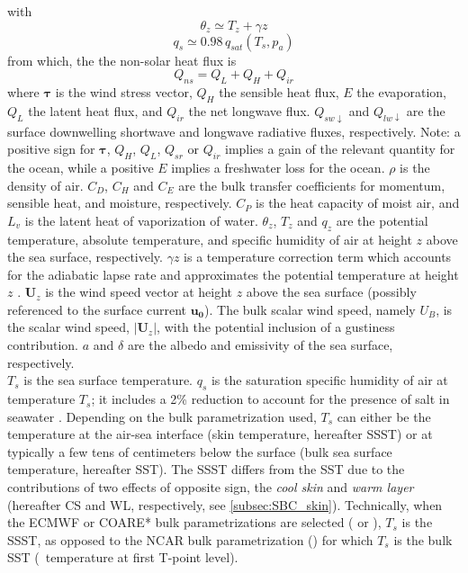 \documentclass[../main/NEMO_manual]{subfiles}
\begin{document}
with
   \[ \theta_z \simeq T_z+\gamma z \]
   \[  q_s \simeq 0.98\,q_{sat}(T_s,p_a ) \]
from which, the the non-solar heat flux is \[ Q_{ns} = Q_L + Q_H + Q_{ir} \]
where $\mathbf{\tau}$ is the wind stress vector, $Q_H$ the sensible heat flux,
$E$ the evaporation, $Q_L$ the latent heat flux, and $Q_{ir}$ the net longwave
flux.
$Q_{sw\downarrow}$ and $Q_{lw\downarrow}$ are the surface downwelling shortwave
and longwave radiative fluxes, respectively.
Note: a positive sign for $\mathbf{\tau}$, $Q_H$, $Q_L$, $Q_{sr}$ or $Q_{ir}$
implies a gain of the relevant quantity for the ocean, while a positive $E$
implies a freshwater loss for the ocean.
$\rho$ is the density of air. $C_D$, $C_H$ and $C_E$ are the bulk transfer
coefficients for momentum, sensible heat, and moisture, respectively.
$C_P$ is the heat capacity of moist air, and $L_v$ is the latent heat of
vaporization of water.
$\theta_z$, $T_z$ and $q_z$ are the potential temperature, absolute temperature,
and specific humidity of air at height $z$ above the sea surface,
respectively. $\gamma z$ is a temperature correction term which accounts for the
adiabatic lapse rate and approximates the potential temperature at height
$z$ \citep{josey.gulev.ea_OCC13}.
$\mathbf{U}_z$ is the wind speed vector at height $z$ above the sea surface
(possibly referenced to the surface current $\mathbf{u_0}$).%
The bulk scalar wind speed, namely $U_B$, is the scalar wind speed,
$|\mathbf{U}_z|$, with the potential inclusion of a gustiness contribution.
$a$ and $\delta$ are the albedo and emissivity of the sea surface, respectively.\\
$T_s$ is the sea surface temperature. $q_s$ is the saturation specific humidity
of air at temperature $T_s$; it includes a 2\% reduction to account for the
presence of salt in seawater \citep{sverdrup.johnson.ea_bk42,kraus.businger_QJRMS96}.
Depending on the bulk parametrization used, $T_s$ can either be the temperature
at the air-sea interface (skin temperature, hereafter SSST) or at typically a
few tens of centimeters below the surface (bulk sea surface temperature,
hereafter SST).
The SSST differs from the SST due to the contributions of two effects of
opposite sign, the \emph{cool skin} and \emph{warm layer} (hereafter CS and WL,
respectively, see \autoref{subsec:SBC_skin}).
Technically, when the ECMWF or COARE* bulk parametrizations are selected
( or ),
$T_s$ is the SSST, as opposed to the NCAR bulk parametrization
() for which $T_s$ is the bulk SST (\ie~temperature
at first T-point level).
\end{document}
